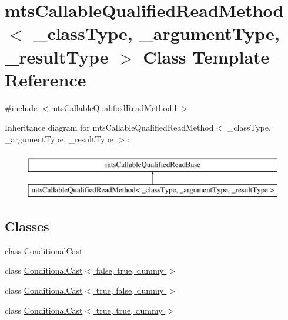 \hypertarget{classmts_callable_qualified_read_method}{}\section{mts\+Callable\+Qualified\+Read\+Method$<$ \+\_\+class\+Type, \+\_\+argument\+Type, \+\_\+result\+Type $>$ Class Template Reference}
\label{classmts_callable_qualified_read_method}


{\ttfamily \#include $<$mts\+Callable\+Qualified\+Read\+Method.\+h$>$}

Inheritance diagram for mts\+Callable\+Qualified\+Read\+Method$<$ \+\_\+class\+Type, \+\_\+argument\+Type, \+\_\+result\+Type $>$\+:\begin{figure}[H]
\begin{center}
\leavevmode
\includegraphics[height=2.000000cm]{d1/d80/classmts_callable_qualified_read_method}
\end{center}
\end{figure}
\subsection*{Classes}
\begin{DoxyCompactItemize}
\item 
class \hyperlink{classmts_callable_qualified_read_method_1_1_conditional_cast}{Conditional\+Cast}
\item 
class \hyperlink{classmts_callable_qualified_read_method_1_1_conditional_cast_3_01false_00_01true_00_01dummy_01_4}{Conditional\+Cast$<$ false, true, dummy $>$}
\item 
class \hyperlink{classmts_callable_qualified_read_method_1_1_conditional_cast_3_01true_00_01false_00_01dummy_01_4}{Conditional\+Cast$<$ true, false, dummy $>$}
\item 
class \hyperlink{classmts_callable_qualified_read_method_1_1_conditional_cast_3_01true_00_01true_00_01dummy_01_4}{Conditional\+Cast$<$ true, true, dummy $>$}
\end{DoxyCompactItemize}
